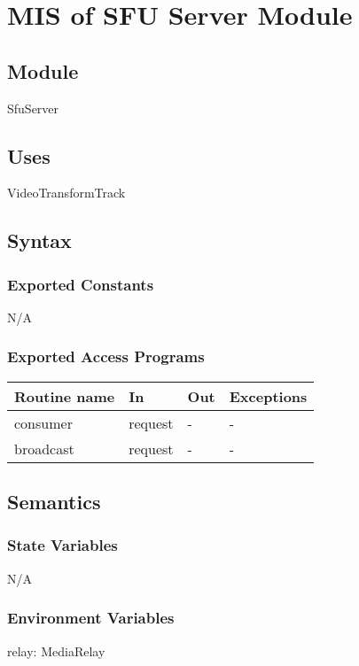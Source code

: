 \documentclass[12pt, titlepage]{article}
\begin{document}
\section{MIS of SFU Server Module} \label{sec:sfuserver}

\subsection{Module}
SfuServer

\subsection{Uses}
VideoTransformTrack

\subsection{Syntax}

\subsubsection{Exported Constants}
N/A

\subsubsection{Exported Access Programs}
\begin{table}[h!]
  \centering
  \begin{tabular}{llll}
    \hline
    \textbf{Routine name} & \textbf{In}   & \textbf{Out} & \textbf{Exceptions} \\
    \hline
    consumer        & request & -      & -             \\
    broadcast       & request & -      & -             \\
    \hline
  \end{tabular}
\end{table}

\subsection{Semantics}

\subsubsection{State Variables}
N/A

\subsubsection{Environment Variables}
relay: MediaRelay
\end{document}
